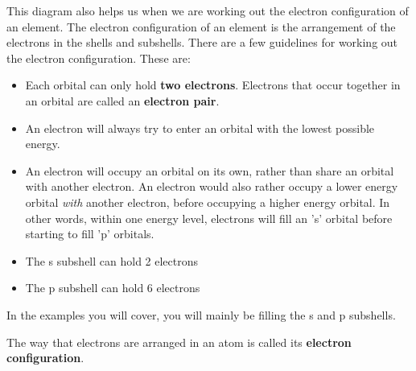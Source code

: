 \label{m38741*eip-752}This diagram also helps us when we are working out the electron configuration of an element. The electron configuration of an element is the arrangement of the electrons in the shells and subshells. There are a few guidelines for working out the electron configuration. These are:
\par \label{m38741*id259303}\begin{itemize}[noitemsep]
            \label{m38741*uid93}\item Each orbital can only hold \textbf{two electrons}. Electrons that occur together in an orbital are called an \textbf{electron pair}.
\label{m38741*uid94}\item An electron will always try to enter an orbital with the lowest possible energy.
\label{m38741*uid95}\item An electron will occupy an orbital on its own, rather than share an orbital with another electron. An electron would also rather occupy a lower energy orbital \textsl{with} another electron, before occupying a higher energy orbital. In other words, within one energy level, electrons will fill an 's' orbital before starting to fill 'p' orbitals.
\label{m38741*uid83}\item The s subshell can hold 2 electrons
\label{m38741*uid84}\item The p subshell can hold 6 electrons
\end{itemize}
        \label{m38741*eip-15}In the examples you will cover, you will mainly be filling the s and p subshells.
\par 
        \label{m38741*id259599}The way that electrons are arranged in an atom is called its \textbf{electron configuration}.\par 

